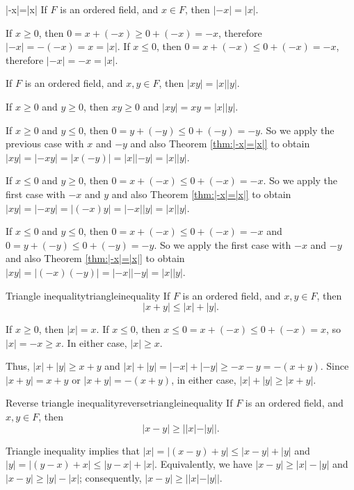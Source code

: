 \begin{thm}{}{|-x|=|x|}
	If \(F\) is an ordered field, and \(x \in F\), then \(|-x| = |x|\).
\end{thm}

\begin{dem}{}{}
	If \(x \geq 0\), then \(0 = x + (-x) \geq 0 + (-x) = -x\), therefore \(|-x| = -(-x) = x = |x|\).
	If \(x \leq 0\), then \(0 = x + (-x) \leq 0 + (-x) = -x\), therefore \(|-x| = -x = |x|\).
\end{dem}

\begin{thm}{}{}
	If \(F\) is an ordered field, and \(x, y \in F\), then \(|xy| = |x||y|\).
\end{thm}

\begin{dem}{}{}
	If \(x \geq 0\) and \(y \geq 0\), then \(xy \geq 0\) and \(|xy| = xy = |x||y|\).

	If \(x \geq 0\) and \(y \leq 0\), then \(0 = y + (-y) \leq 0 + (-y) = -y\). So we apply the previous case with \(x\) and \(-y\) and also Theorem \ref{thm:|-x|=|x|} to obtain \(|xy| = |-xy| = |x(-y)| = |x||-y| = |x||y|\).

	If \(x \leq 0\) and \(y \geq 0\), then \(0 = x + (-x) \leq 0 + (-x) = -x\). So we apply the first case with \(-x\) and \(y\) and also Theorem \ref{thm:|-x|=|x|} to obtain \(|xy| = |-xy| = |(-x)y| = |-x||y| = |x||y|\).

	If \(x \leq 0\) and \(y \leq 0\), then \(0 = x + (-x) \leq 0 + (-x) = -x\) and \(0 = y + (-y) \leq 0 + (-y) = -y\). So we apply the first case with \(-x\) and \(-y\) and also Theorem \ref{thm:|-x|=|x|} to obtain \(|xy| = |(-x)(-y)| = |-x||-y| = |x||y|\).
\end{dem}

\begin{thm}{Triangle inequality}{triangleinequality}
	If \(F\) is an ordered field, and \(x, y \in F\), then  \[ |x + y| \leq |x| + |y|.\]
\end{thm}

\begin{dem}{}{}
	If \(x \geq 0\), then \(|x| = x\). If \(x \leq 0\), then \(x \leq 0 = x + (-x) \leq 0 + (-x) = x\), so \(|x| = -x \geq x\). In either case, \(|x| \geq x\).

	Thus,  \(|x| + |y| \geq x + y\)	and \(|x| + |y| = |-x| + |-y| \geq - x - y = -(x + y)\). Since  \(|x + y| = x + y\) or  \(|x + y| = -(x+y)\), in either case, \(|x| + |y| \geq |x + y|\).
\end{dem}

\begin{thm}{Reverse triangle inequality}{reversetriangleinequality}
	If \(F\) is an ordered field, and \(x, y \in F\), then \[
		|x - y| \geq ||x| - |y||.
	\]
\end{thm}

\begin{dem}{}{}
	Triangle inequality implies that \(|x| = |(x - y) + y| \leq |x - y| + |y|\) and  \(|y| = |(y - x) + x| \leq |y - x| + |x|\). Equivalently, we have \(|x - y| \geq |x| - |y|\) and \(|x - y| \geq |y| - |x|\); consequently, \(|x - y| \geq ||x| - |y||\).
\end{dem}

